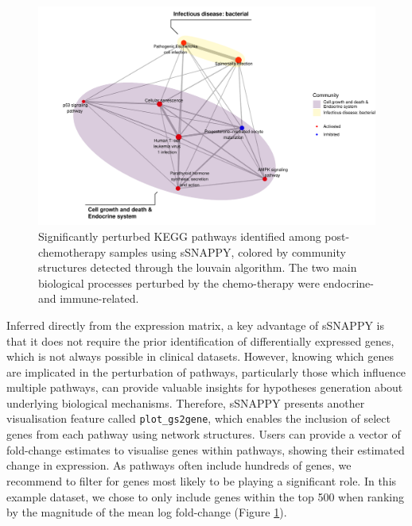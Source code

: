 \documentclass[9pt,a4paper,]{extarticle}
\newenvironment{Shaded}{\begin{snugshade}}{\end{snugshade}}
\newcommand{\DecValTok}[1]{\textcolor[rgb]{0.00,0.00,0.81}{#1}}
\newcommand{\FunctionTok}[1]{\textcolor[rgb]{0.00,0.00,0.00}{#1}}
\newcommand{\NormalTok}[1]{#1}
\newcommand{\OtherTok}[1]{\textcolor[rgb]{0.56,0.35,0.01}{#1}}
\newcommand{\SpecialCharTok}[1]{\textcolor[rgb]{0.00,0.00,0.00}{#1}}
\newcommand{\StringTok}[1]{\textcolor[rgb]{0.31,0.60,0.02}{#1}}
\begin{document}
\begin{figure}

{\centering \includegraphics[width=0.8\linewidth]{sSNAPPY_paper_files/figure-latex/Figure3-1} 

}

\caption{Significantly perturbed KEGG pathways identified among post-chemotherapy samples using sSNAPPY, colored by community structures detected through the louvain algorithm. The two main biological processes perturbed by the chemo-therapy were endocrine- and immune-related.}\label{fig:Figure3}
\end{figure}

Inferred directly from the expression matrix, a key advantage of sSNAPPY is that it does not require the prior identification of differentially expressed genes, which is not always possible in clinical datasets.
However, knowing which genes are implicated in the perturbation of pathways, particularly those which influence multiple pathways, can provide valuable insights for hypotheses generation about underlying biological mechanisms.
Therefore, sSNAPPY presents another visualisation feature called \texttt{plot\_gs2gene}, which enables the inclusion of select genes from each pathway using network structures.
Users can provide a vector of fold-change estimates to visualise genes within pathways, showing their estimated change in expression.
As pathways often include hundreds of genes, we recommend to filter for genes most likely to be playing a significant role.
In this example dataset, we chose to only include genes within the top 500 when ranking by the magnitude of the mean log fold-change (Figure \ref{fig:Figure3}).

\begin{Shaded}
\end{Shaded}
\end{document}
